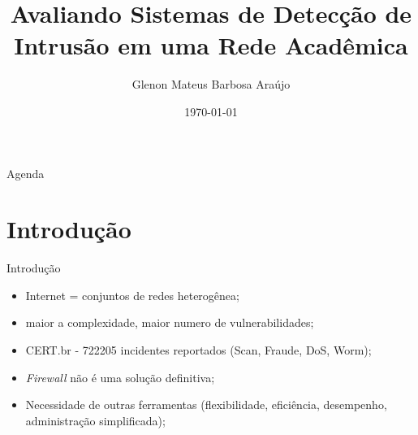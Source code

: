 \documentclass[aspectratio=169]{beamer}
\title{Avaliando Sistemas de Detecção de Intrusão em uma Rede Acadêmica}
\author{Glenon Mateus Barbosa Araújo}
\institute{Trabalho de Conclusão de Curso}
\date{\today}
\begin{document}
\begin{frame}{Agenda}
  \tableofcontents
\end{frame}
\section{Introdução}
\begin{frame}{Introdução}
    \begin{itemize}
        \item Internet = conjuntos de redes heterogênea;
        \item maior a complexidade, maior numero de vulnerabilidades;
        \item CERT.br - 722205 incidentes reportados (Scan, Fraude, DoS, Worm);
        \item \textit{Firewall} não é uma solução definitiva; 
        \item Necessidade de outras ferramentas (flexibilidade, eficiência, desempenho, administração simplificada);
    \end{itemize}
\end{frame}
\end{document}
